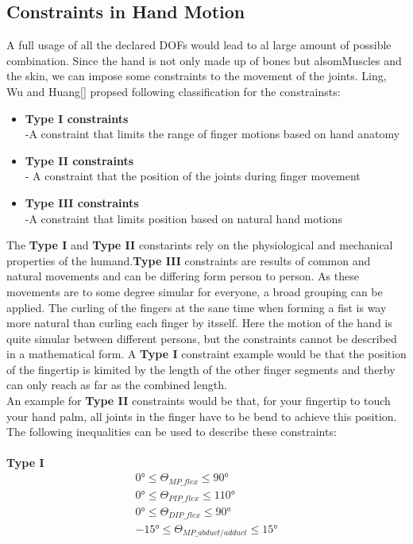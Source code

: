 \subsection{Constraints in Hand Motion}
A full usage of all the declared DOFs would lead to al large amount of possible combination. Since the hand is not only made up of bones but alsomMuscles and the skin, we can impose some constraints to the movement of the joints. Ling, Wu and Huang[\cite{LIN.2000}] propsed following classification for the constrainsts:
\begin{itemize}
\item \textbf{Type I constraints}\\
	-A constraint that limits the range of finger motions based on hand anatomy
	\item \textbf{Type II constraints}\\
	- A constraint that the position of the joints during finger movement
	\item \textbf{Type III constraints\\}
	-A constraint that limits position based on natural hand motions
\end{itemize} 
The \textbf{Type I} and \textbf{Type II} constarints rely on the physiological and mechanical properties of the humand.\textbf{Type III} constraints are results of common and natural
movements and can be differing form person to person. As these movements are to some degree simular for everyone, a broad grouping can be applied. The curling of the fingers at the sane time when forming a fist is way more natural than curling each finger by itsself. Here the motion of the hand is quite simular between different persons, but the constraints cannot be described in a mathematical form. 
 A \textbf{Type I} constraint example would be that the position of the fingertip is kimited by the length of the other finger segments and therby can only reach as far as the combined length.\\An example for \textbf{Type II} constraints would be that, for your fingertip to touch your hand palm, all joints in the finger have to be bend to achieve this position.
The following inequalities can be used to describe these constraints:\\
\\\textbf{Type I}
\begin{equation}
\begin{split}
0°\leq \Theta _{MP\_flex} \leq 90°\\
0°\leq \Theta _{PIP\_flex} \leq 110°\\
0°\leq \Theta _{DIP\_flex} \leq 90°\\
-15°\leq \Theta _{MP\_abduct/adduct} \leq 15°
\end{split}
\end{equation}
